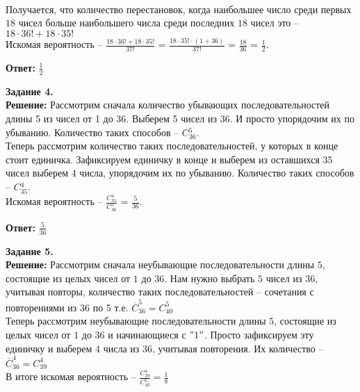 \documentclass[12pt,a4paper]{scrartcl}
\begin{document}
	\\
	Получается, что количество перестановок, когда наибольшее число среди первых $18$ чисел больше наибольшего числа среди последних $18$ чисел это -- $18 \cdot 36! + 18 \cdot 35!$ 
	\\		
	Искомая вероятность -- 	
	$\frac{18 \cdot 36! + 18 \cdot 35!}{37!}$ = $\frac{18 \cdot 35! \cdot (1 + 36)}{37!}$ = $\frac{18}{36}$ = $\frac{1}{2}$.
	\begin{flushright}	
		\textbf{Ответ:} $\frac{1}{2}$
	\end{flushright}
	\newpage
	\noindent
	\textbf{Задание 4.} 
	\\
	\textbf{Решение:} Рассмотрим сначала количество убывающих последовательностей длины 5 из чисел от 1 до 36. Выберем 5 чисел из 36. И просто упорядочим их по убыванию. Количество таких способов -- $C{_{36}^{5}}$.
	\\
	Теперь рассмотрим количество таких последовательностей, у которых в конце стоит единичка. Зафиксируем единичку в конце и выберем из оставшихся 35 чисел выберем 4 числа, упорядочим их по убыванию. Количество таких способов -- $C{_{35}^{4}}$.
	\\
	Искомая вероятность -- $\frac{C{_{35}^{4}}}{C{_{36}^{5}}}$ = $\frac{5}{36}$.
	\begin{flushright}
		\textbf{Ответ:} $\frac{5}{36}$
	\end{flushright}
	\textbf{Задание 5.} 
	\\
	\textbf{Решение:} Рассмотрим сначала неубывающие последовательности длины $5$, состоящие из целых чисел от $1$ до $36$. Нам нужно выбрать $5$ чисел из 36, учитывая повторы, количество таких последовательностей -- сочетания с повторениями из 36 по 5 т.е. $\overline{C}_{36}^{5} = C_{40}^{5}$ \\
	Теперь рассмотрим неубывающие последовательности длины $5$, состоящие из целых чисел от $1$ до $36$ и начинающиеся с $"1"$. Просто зафиксируем эту единичку и выберем 4 числа из 36, учитывая повторения. Их количество -- $\overline{C}_{36}^{4} = C_{39}^{4}$ \\
	В итоге искомая вероятность -- $\frac{C{_{39}^{4}}}{C{_{40}^{5}}} = \frac{1}{8}$
	
\end{document}
